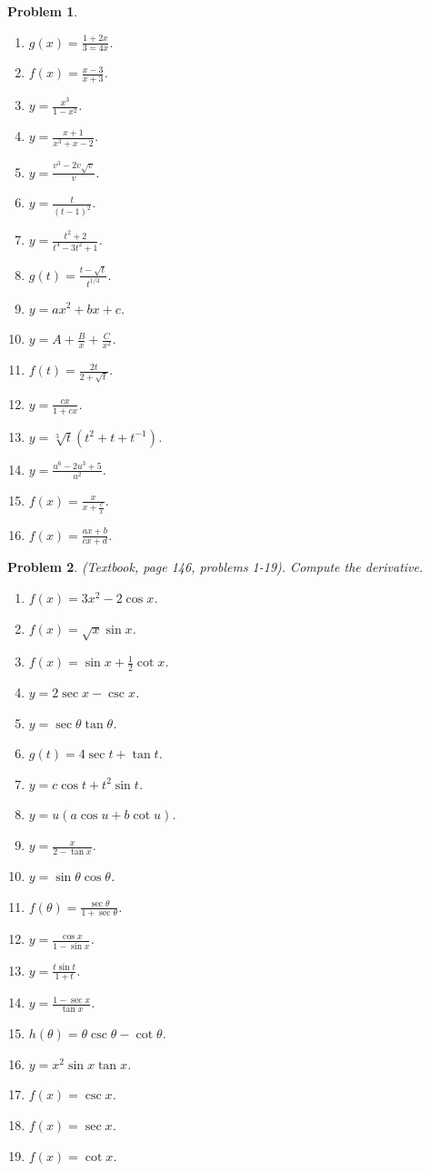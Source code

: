 \documentclass{article}
\newtheorem{problem}{Problem}
\begin{document}
\begin{problem}
\begin{multicols}{3}
\begin{enumerate}
\item $g(x)=\frac{1+2x}{3=4x}$.
\item $f(x)=\frac{x-3}{x+3}$.
\item $y=\frac{x^3}{1-x^2}$.
\item $y=\frac{x+1}{x^3+x-2}$.
\item $y=\frac{v^3-2v\sqrt{v}}{v}$.
\item $y=\frac{t}{(t-1)^2}$.
\item $y=\frac{t^2+2}{t^4-3t^2+1}$.
\item $g(t)=\frac{t-\sqrt{t}}{t^{1/3}}$.
\item $y=a x^2+b x + c$.
\item $y=A+\frac{B}x +\frac{C}{x^2}$.
\item $f(t)=\frac{2t}{2+\sqrt{t}}$.
\item $y=\frac{c x}{1+c x}$.
\item $y=\sqrt[3]{t}(t^2+t+t^{-1}) $.
\item $y=\frac{u^6-2u^3+5}{u^2}$.
\item $f(x)=\frac{x}{x+\frac{c}{x}}$.
\item $f(x)=\frac{a x+b}{c x+ d}$.
\end{enumerate}
\end{multicols}
\end{problem}
\begin{problem}(Textbook, page 146, problems 1-19).
Compute the derivative.
\begin{multicols}{3}
\begin{enumerate}
\item $f(x)= 3x^2 -2 \cos x$.
\item $f(x)=\sqrt{x}\sin x$.
\item $f(x)=\sin x +\frac{1}{2}\cot x$.
\item $y=2\sec x - \csc x$.
\item $y=\sec \theta \tan \theta$.
\item $g(t)=4 \sec t + \tan t$.
\item $y= c\cos t + t^2\sin t$.
\item $y=u(a\cos u + b \cot u)$.
\item $y=\frac{x}{2-\tan x}$.
\item $y=\sin \theta \cos \theta$.
\item $f(\theta)=\frac{\sec \theta}{1+\sec \theta}$.
\item $y=\frac{\cos x}{1-\sin x}$.
\item $y=\frac{t\sin t}{1+t}$.
\item $y=\frac{1-\sec x}{\tan x}$.
\item $h(\theta)=\theta \csc \theta -\cot \theta$.
\item $y=x^2\sin x\tan x$.
\item $f(x)=\csc x$.
\item $f(x)=\sec x$.
\item $f(x)=\cot x$.
\end{enumerate}
\end{multicols}
\end{problem}
\end{document}

